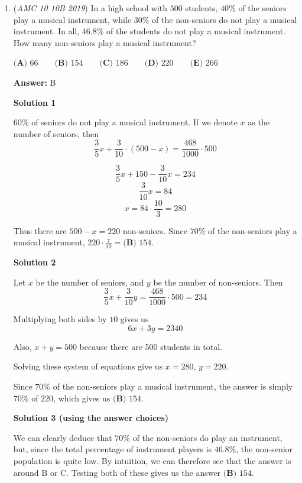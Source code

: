\begin{enumerate}
 minor edit (the inclusion of not) by AlcBoy1729

 


	\item (\textit{AMC 10 10B 2019}) In a high school with $500$ students, $40\%$ of the seniors play a musical instrument, while $30\%$ of the non-seniors do not play a musical instrument. In all, $46.8\%$ of the students do not play a musical instrument. How many non-seniors play a musical instrument?


 $\textbf{(A) } 66 \qquad\textbf{(B) } 154 \qquad\textbf{(C) } 186 \qquad\textbf{(D) } 220 \qquad\textbf{(E) } 266$

 \textbf{Answer: }B



\textbf{Solution 1}

$60\%$ of seniors do not play a musical instrument. If we denote $x$ as the number of seniors, then 
 \[\frac{3}{5}x + \frac{3}{10}\cdot(500-x) = \frac{468}{1000}\cdot500\]

 \[\frac{3}{5}x + 150 - \frac{3}{10}x = 234\]
 \[\frac{3}{10}x = 84\]
 \[x = 84\cdot\frac{10}{3} = 280\]

 Thus there are $500-x = 220$ non-seniors. Since $70\%$ of the non-seniors play a musical instrument, $220 \cdot \frac{7}{10} = \boxed{\textbf{(B) } 154}$.

 



\textbf{Solution 2}

Let $x$ be the number of seniors, and $y$ be the number of non-seniors. Then 
 \[\frac{3}{5}x + \frac{3}{10}y = \frac{468}{1000}\cdot500 = 234\]

 Multiplying both sides by $10$ gives us
 \[6x + 3y = 2340\]

 Also, $x + y = 500$ because there are 500 students in total.

 Solving these system of equations give us $x = 280$,   $y = 220$.

 Since $70\%$ of the non-seniors play a musical instrument, the answer is simply $70\%$ of $220$, which gives us $\boxed{\textbf{(B) } 154}$.

 



\textbf{Solution 3 (using the answer choices)}

We can clearly deduce that $70\%$ of the non-seniors do play an instrument, but, since the total percentage of instrument players is $46.8\%$, the non-senior population is quite low. By intuition, we can therefore see that the answer is around $\text{B}$ or $\text{C}$. Testing both of these gives us the answer $\boxed{\textbf{(B) } 154}$.


\end{enumerate}
